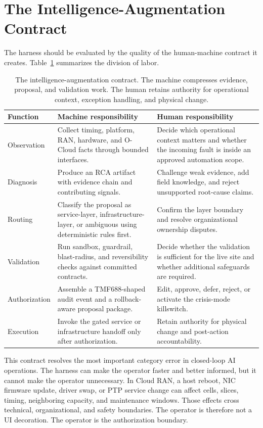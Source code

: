 \documentclass[twocolumn,10pt,a4paper]{article}
\begin{document}
\section{The Intelligence-Augmentation Contract}
\label{sec:contract}

The harness should be evaluated by the quality of the human-machine contract it creates. Table~\ref{tab:contract} summarizes the division of labor.

\begin{table}[t]
\centering
\small
\begin{tabularx}{\textwidth}{p{3.5cm}X X}
\toprule
Function & Machine responsibility & Human responsibility \\
\midrule
Observation & Collect timing, platform, RAN, hardware, and O-Cloud facts through bounded interfaces. & Decide which operational context matters and whether the incoming fault is inside an approved automation scope. \\
Diagnosis & Produce an RCA artifact with evidence chain and contributing signals. & Challenge weak evidence, add field knowledge, and reject unsupported root-cause claims. \\
Routing & Classify the proposal as service-layer, infrastructure-layer, or ambiguous using deterministic rules first. & Confirm the layer boundary and resolve organizational ownership disputes. \\
Validation & Run sandbox, guardrail, blast-radius, and reversibility checks against committed contracts. & Decide whether the validation is sufficient for the live site and whether additional safeguards are required. \\
Authorization & Assemble a TMF688-shaped audit event and a rollback-aware proposal package. & Edit, approve, defer, reject, or activate the crisis-mode killswitch. \\
Execution & Invoke the gated service or infrastructure handoff only after authorization. & Retain authority for physical change and post-action accountability. \\
\bottomrule
\end{tabularx}
\caption{The intelligence-augmentation contract. The machine compresses evidence, proposal, and validation work. The human retains authority for operational context, exception handling, and physical change.}
\label{tab:contract}
\end{table}

This contract resolves the most important category error in closed-loop AI operations. The harness can make the operator faster and better informed, but it cannot make the operator unnecessary. In Cloud RAN, a host reboot, NIC firmware update, driver swap, or PTP service change can affect cells, slices, timing, neighboring capacity, and maintenance windows. Those effects cross technical, organizational, and safety boundaries. The operator is therefore not a UI decoration. The operator is the authorization boundary.
\end{document}
